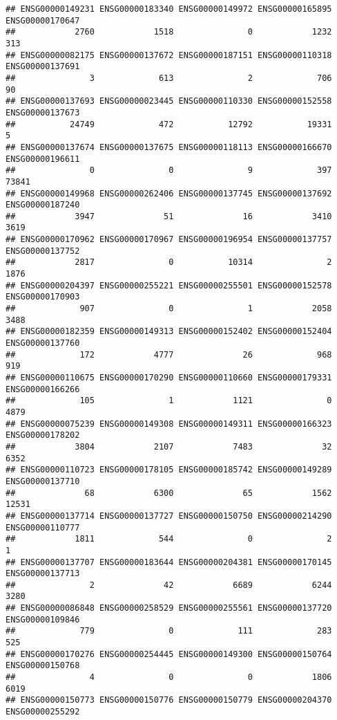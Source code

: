 \documentclass[
]{article}
\begin{document}
\begin{verbatim}
## ENSG00000149231 ENSG00000183340 ENSG00000149972 ENSG00000165895 ENSG00000170647 
##            2760            1518               0            1232             313 
## ENSG00000082175 ENSG00000137672 ENSG00000187151 ENSG00000110318 ENSG00000137691 
##               3             613               2             706              90 
## ENSG00000137693 ENSG00000023445 ENSG00000110330 ENSG00000152558 ENSG00000137673 
##           24749             472           12792           19331               5 
## ENSG00000137674 ENSG00000137675 ENSG00000118113 ENSG00000166670 ENSG00000196611 
##               0               0               9             397           73841 
## ENSG00000149968 ENSG00000262406 ENSG00000137745 ENSG00000137692 ENSG00000187240 
##            3947              51              16            3410            3619 
## ENSG00000170962 ENSG00000170967 ENSG00000196954 ENSG00000137757 ENSG00000137752 
##            2817               0           10314               2            1876 
## ENSG00000204397 ENSG00000255221 ENSG00000255501 ENSG00000152578 ENSG00000170903 
##             907               0               1            2058            3488 
## ENSG00000182359 ENSG00000149313 ENSG00000152402 ENSG00000152404 ENSG00000137760 
##             172            4777              26             968             919 
## ENSG00000110675 ENSG00000170290 ENSG00000110660 ENSG00000179331 ENSG00000166266 
##             105               1            1121               0            4879 
## ENSG00000075239 ENSG00000149308 ENSG00000149311 ENSG00000166323 ENSG00000178202 
##            3804            2107            7483              32            6352 
## ENSG00000110723 ENSG00000178105 ENSG00000185742 ENSG00000149289 ENSG00000137710 
##              68            6300              65            1562           12531 
## ENSG00000137714 ENSG00000137727 ENSG00000150750 ENSG00000214290 ENSG00000110777 
##            1811             544               0               2               1 
## ENSG00000137707 ENSG00000183644 ENSG00000204381 ENSG00000170145 ENSG00000137713 
##               2              42            6689            6244            3280 
## ENSG00000086848 ENSG00000258529 ENSG00000255561 ENSG00000137720 ENSG00000109846 
##             779               0             111             283             525 
## ENSG00000170276 ENSG00000254445 ENSG00000149300 ENSG00000150764 ENSG00000150768 
##               4               0               0            1806            6019 
## ENSG00000150773 ENSG00000150776 ENSG00000150779 ENSG00000204370 ENSG00000255292 

\end{verbatim}
\end{document}
